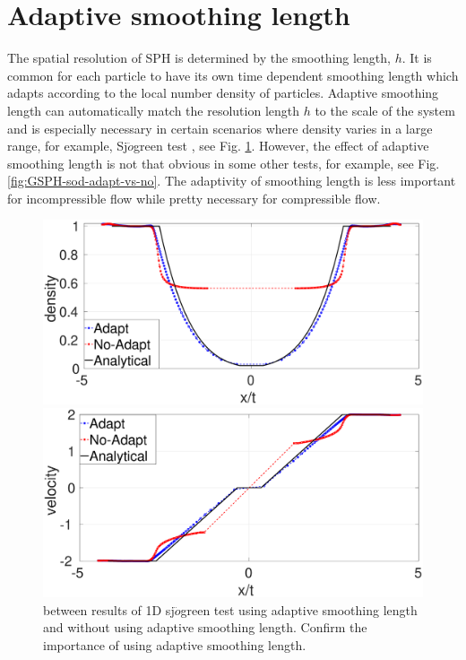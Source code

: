 \section{Adaptive smoothing length}
The spatial resolution of SPH is determined by the smoothing length, $h$. It is common for each particle to have its own time dependent smoothing length which adapts according to the local number density of particles. Adaptive smoothing length can automatically match the resolution length $h$ to the scale of the system and is especially necessary in certain scenarios where density varies in a large range, for example, Sj$\ddot{o}$green test \citep{jeffreyquasilinear}, see Fig. \ref{fig:sjogreen-adapt-vs-no}. However, the effect of adaptive smoothing length is not that obvious in some other tests, for example, see Fig. \ref{fig:GSPH-sod-adapt-vs-no}.
The adaptivity of smoothing length is less important for incompressible flow while pretty necessary for compressible flow. 
\begin{figure}[h]
    \centering
	\begin{minipage}{.48\textwidth}
        \centering
        \includegraphics[width=0.99 \textwidth]{./Chapter-3/Figures/Sjogreen-adptVSno-d}
	\end{minipage}%
	\begin{minipage}{.48\textwidth}
        \centering
        \includegraphics[width=0.99 \textwidth]{./Chapter-3/Figures/Sjogreen-adptVSno-v}
	\end{minipage}
\caption{between results of 1D sj$\ddot{o}$green test using adaptive smoothing length and without using adaptive smoothing length. Confirm the importance of using adaptive smoothing length.}
    \label{fig:sjogreen-adapt-vs-no}
\end{figure}

